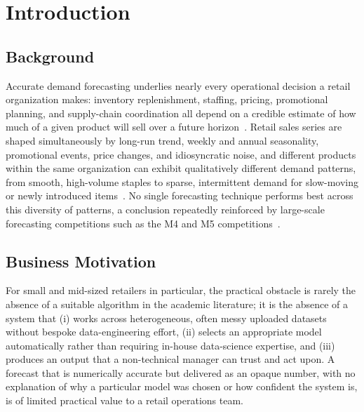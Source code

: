 \section{Introduction}
\label{sec:introduction}

\subsection{Background}
Accurate demand forecasting underlies nearly every operational decision a retail organization makes: inventory replenishment, staffing, pricing, promotional planning, and supply-chain coordination all depend on a credible estimate of how much of a given product will sell over a future horizon~\cite{fildes2022retail}. Retail sales series are shaped simultaneously by long-run trend, weekly and annual seasonality, promotional events, price changes, and idiosyncratic noise, and different products within the same organization can exhibit qualitatively different demand patterns, from smooth, high-volume staples to sparse, intermittent demand for slow-moving or newly introduced items~\cite{croston1972}. No single forecasting technique performs best across this diversity of patterns, a conclusion repeatedly reinforced by large-scale forecasting competitions such as the M4 and M5 competitions~\cite{makridakis2020m4,makridakis2022m5}.

\subsection{Business Motivation}
For small and mid-sized retailers in particular, the practical obstacle is rarely the absence of a suitable algorithm in the academic literature; it is the absence of a system that (i) works across heterogeneous, often messy uploaded datasets without bespoke data-engineering effort, (ii) selects an appropriate model automatically rather than requiring in-house data-science expertise, and (iii) produces an output that a non-technical manager can trust and act upon. A forecast that is numerically accurate but delivered as an opaque number, with no explanation of why a particular model was chosen or how confident the system is, is of limited practical value to a retail operations team.

